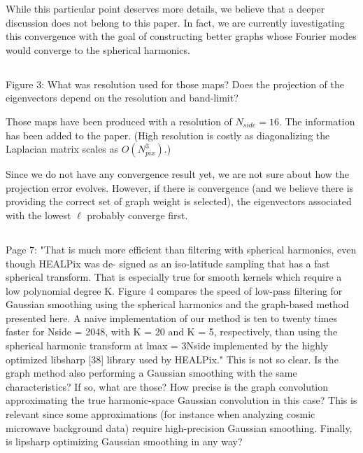 \documentclass[12pt,a4paper]{article}
\newcommand{\1}{\b{1}}              %
\newcommand{\0}{\b{0}}              %
\begin{document}
While this particular point deserves more details, we believe that a deeper discussion does not belong to this paper.
In fact, we are currently investigating this convergence with the goal of constructing better graphs whose Fourier modes would converge to
the spherical harmonics.

\subsection{}

\begin{mdframed}[style=comment]
Figure 3: What was resolution used for those maps? Does the projection of the eigenvectors depend on the resolution and band-limit?
\end{mdframed}

Those maps have been produced with a resolution of $N_{side}=16$. The information has been added to the paper. (High resolution is costly as diagonalizing the Laplacian matrix scales as $O(N_{pix}^3)$.)

Since we do not have any convergence result yet, we are not sure about how the projection error evolves. However, if there is convergence (and we believe there is providing the correct set of graph weight is selected), the eigenvectors associated with the lowest $\ell$ probably converge first.

\subsection{}
\begin{mdframed}[style=comment]
Page 7: "That is much more efficient than filtering with spherical harmonics, even though HEALPix was de- signed as an iso-latitude sampling that has a fast spherical transform. That is especially true for smooth kernels which require a low polynomial degree K. Figure 4 compares the speed of low-pass filtering for Gaussian smoothing using the spherical harmonics and the graph-based method presented here. A naive implementation of our method is ten to twenty times faster for Nside = 2048, with K = 20 and K = 5, respectively, than using the spherical harmonic transform at lmax = 3Nside implemented by the highly optimized libsharp [38] library used by HEALPix." This is not so clear. Is the graph method also performing a Gaussian smoothing with the same characteristics? If so, what are those? How precise is the graph convolution approximating the true harmonic-space Gaussian convolution in this case? This is relevant since some approximations (for instance when analyzing cosmic microwave background data) require high-precision Gaussian smoothing. Finally, is lipsharp optimizing Gaussian smoothing in any way?
\end{mdframed}
\end{document}
